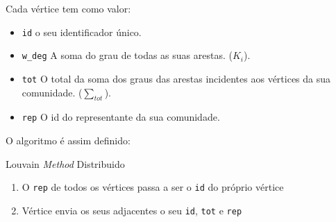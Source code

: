 \documentclass[a4paper,10pt]{report}
\begin{document}
Cada vértice tem como valor:
\begin{itemize}
	\item \verb|id| o seu identificador único.
	\item \verb|w_deg| A soma do grau de todas as suas arestas. ($K_i$).
	\item \verb|tot| O total da soma dos graus das arestas incidentes aos vértices da sua comunidade. ($\sum_{tot}$).
	\item \verb|rep| O id do representante da sua comunidade.
\end{itemize}

O algoritmo é assim definido:

\begin{algorithm}
\caption{Louvain \textit{Method} Distribuido}
\begin{enumerate}
	\item O \verb|rep| de todos os vértices passa a ser o \verb|id| do próprio vértice
	\item Vértice envia os seus adjacentes o seu \verb|id|, \verb|tot| e \verb|rep|
\end{enumerate}
\end{algorithm}
\end{document}
